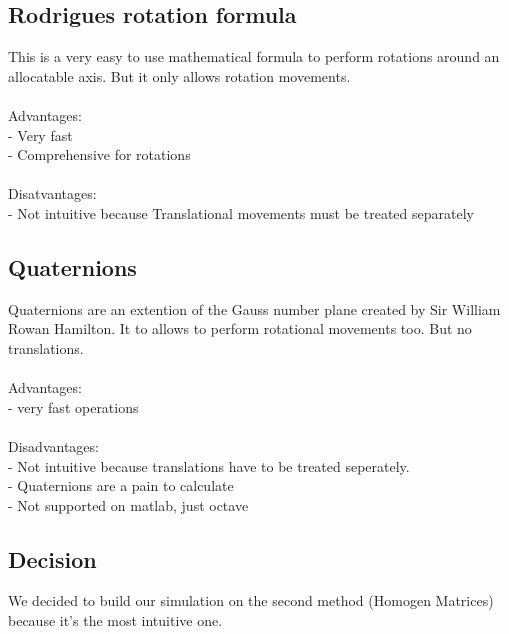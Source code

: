 \subsection{Rodrigues rotation formula}
This is a very easy to use mathematical formula to perform rotations around an allocatable axis. But it only allows rotation movements.\\\\
Advantages:\\
- Very fast\\
- Comprehensive for rotations\\\\
Disatvantages:\\
- Not intuitive because Translational movements must be treated separately\\

\subsection{Quaternions}
Quaternions are an extention of the Gauss number plane created by Sir William Rowan Hamilton. It to allows to perform rotational movements too. But no translations.\\\\
Advantages:\\
- very fast operations\\\\
Disadvantages:\\
- Not intuitive because translations have to be treated seperately.\\
- Quaternions are a pain to calculate\\
- Not supported on matlab, just octave\\

\subsection{Decision}
We decided to build our simulation on the second method (Homogen Matrices) because it's the most intuitive one.


